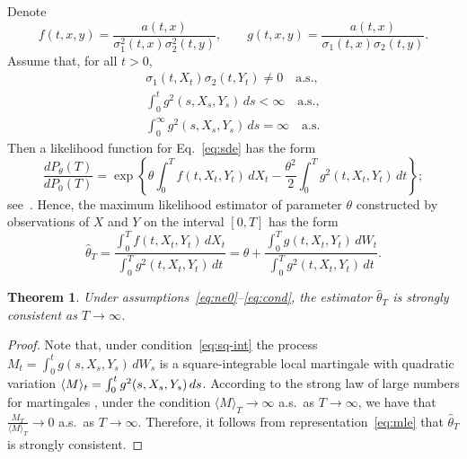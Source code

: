 \documentclass[numbers,compress,v1.0.1]{vmsta}
\newtheorem{thm}{Theorem}
\theoremstyle{remark}
\newtheorem{remark}{Remark}
\newcommand*{\set}[1]{\left\{#1\right\}}
\begin{document}
Denote
%
\[
f(t,x,y)=\frac{a(t,x)}{\sigma_1^2(t,x)\sigma_2^2(t,y)},\qquad g(t,x,y)=\frac{a(t,x)}{\sigma_1(t,x)\sigma_2(t,y)}.
\]
%
Assume that, for all $t>0$,
%
\begin{gather}
\sigma_1(t,X_t)\sigma_2(t,Y_t)
\ne0 \quad\text{a.s.},\label{eq:ne0}
\\
\int_0^t g^2(s,X_s,Y_s)
\,ds<\infty \quad\text{a.s.},\label{eq:sq-int}
\\
\int_0^\infty g^2(s,X_s,Y_s)
\,ds=\infty \quad\text{a.s.}\label{eq:cond}
\end{gather}
%
Then a likelihood function for Eq.~\eqref{eq:sde} has the form
%
\[
\frac{dP_{\theta}(T)}{dP_{0}(T)}= \exp\set{\theta\int_0^Tf(t,X_t,Y_t)
\,dX_t -\frac{\theta^{2}}{2}\int_0^Tg^2(t,X_t,Y_t)
\,dt};
\]
%
see~\cite[Ch.~7]{liptser-stat1}. Hence, the maximum likelihood
estimator of parameter $\theta$ constructed by observations of $X$ and
$Y$ on the interval $[0,T]$ has the form
%
\begin{equation}
\label{eq:mle} \hat{\theta}_{T}=\frac{\int_0^Tf(t,X_t,Y_t)\,dX_t}%
{\int_0^Tg^2(t,X_t,Y_t)\,dt} =\theta+
\frac{\int_0^Tg(t,X_t,Y_t)\,dW_t}%
{\int_0^Tg^2(t,X_t,Y_t)\,dt}.
\end{equation}

\begin{thm}\label{th:gen}
Under assumptions~\eqref{eq:ne0}--\eqref{eq:cond}, the estimator $\hat
{\theta}_{T}$ is strongly consistent as
$T\to\infty$.
\end{thm}

\begin{proof}
Note that, under condition~\eqref{eq:sq-int} the process
$M_t=\int_0^tg(s,X_s,Y_s)\,dW_s$
is a square-integrable local martingale with quadratic
variation
$\langle
M\rangle_t=\break\int_0^tg^2(s,X_s,Y_s)\,ds$.
According to the strong law of large numbers for martingales
\cite[Ch.~2, \S~6, Thm.~10, Cor.~1]{liptser-shiryaev1}, under the condition
$\langle M\rangle_{T}\rightarrow\infty$ a.s.\ as $T\to\infty$,
we have that $\frac{M_{T}}{\langle M\rangle_{T}}\rightarrow 0$
a.s.\ as $T\to\infty$. Therefore, it follows from
representation~\eqref{eq:mle} that $\hat{\theta}_T$ is strongly
consistent.
\end{proof}
%
\end{document}
